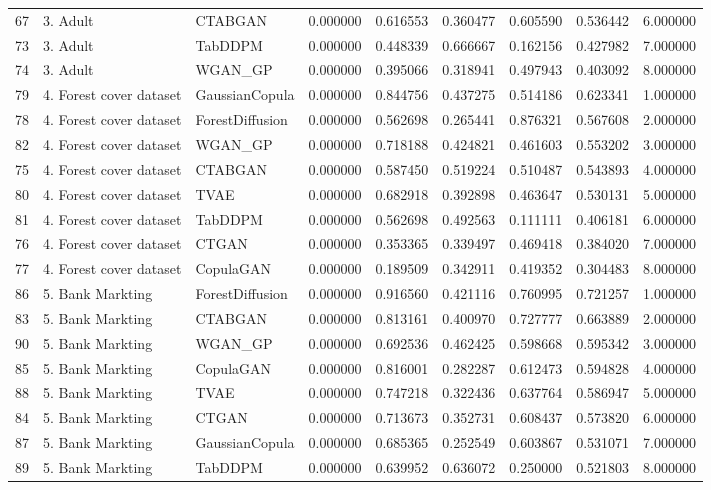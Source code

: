 \begin{tabular}{lllrrrrrr}
67 & 3. Adult & CTABGAN & 0.000000 & 0.616553 & 0.360477 & 0.605590 & 0.536442 & 6.000000 \\
73 & 3. Adult & TabDDPM & 0.000000 & 0.448339 & 0.666667 & 0.162156 & 0.427982 & 7.000000 \\
74 & 3. Adult & WGAN_GP & 0.000000 & 0.395066 & 0.318941 & 0.497943 & 0.403092 & 8.000000 \\
79 & 4. Forest cover dataset & GaussianCopula & 0.000000 & 0.844756 & 0.437275 & 0.514186 & 0.623341 & 1.000000 \\
78 & 4. Forest cover dataset & ForestDiffusion & 0.000000 & 0.562698 & 0.265441 & 0.876321 & 0.567608 & 2.000000 \\
82 & 4. Forest cover dataset & WGAN_GP & 0.000000 & 0.718188 & 0.424821 & 0.461603 & 0.553202 & 3.000000 \\
75 & 4. Forest cover dataset & CTABGAN & 0.000000 & 0.587450 & 0.519224 & 0.510487 & 0.543893 & 4.000000 \\
80 & 4. Forest cover dataset & TVAE & 0.000000 & 0.682918 & 0.392898 & 0.463647 & 0.530131 & 5.000000 \\
81 & 4. Forest cover dataset & TabDDPM & 0.000000 & 0.562698 & 0.492563 & 0.111111 & 0.406181 & 6.000000 \\
76 & 4. Forest cover dataset & CTGAN & 0.000000 & 0.353365 & 0.339497 & 0.469418 & 0.384020 & 7.000000 \\
77 & 4. Forest cover dataset & CopulaGAN & 0.000000 & 0.189509 & 0.342911 & 0.419352 & 0.304483 & 8.000000 \\
86 & 5. Bank Markting & ForestDiffusion & 0.000000 & 0.916560 & 0.421116 & 0.760995 & 0.721257 & 1.000000 \\
83 & 5. Bank Markting & CTABGAN & 0.000000 & 0.813161 & 0.400970 & 0.727777 & 0.663889 & 2.000000 \\
90 & 5. Bank Markting & WGAN_GP & 0.000000 & 0.692536 & 0.462425 & 0.598668 & 0.595342 & 3.000000 \\
85 & 5. Bank Markting & CopulaGAN & 0.000000 & 0.816001 & 0.282287 & 0.612473 & 0.594828 & 4.000000 \\
88 & 5. Bank Markting & TVAE & 0.000000 & 0.747218 & 0.322436 & 0.637764 & 0.586947 & 5.000000 \\
84 & 5. Bank Markting & CTGAN & 0.000000 & 0.713673 & 0.352731 & 0.608437 & 0.573820 & 6.000000 \\
87 & 5. Bank Markting & GaussianCopula & 0.000000 & 0.685365 & 0.252549 & 0.603867 & 0.531071 & 7.000000 \\
89 & 5. Bank Markting & TabDDPM & 0.000000 & 0.639952 & 0.636072 & 0.250000 & 0.521803 & 8.000000 \\

\end{tabular}
